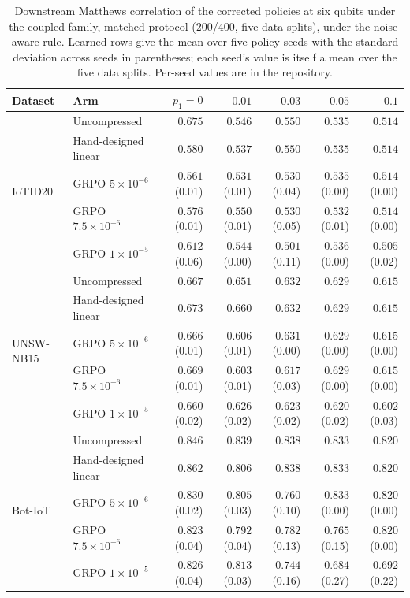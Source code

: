 \begin{table}[t]
\centering
\footnotesize
\setlength{\tabcolsep}{2.5pt}
\caption{Downstream Matthews correlation of the corrected policies at six qubits under
the coupled family, matched protocol (200/400, five data splits), under the noise-aware rule.
Learned rows give the mean over five policy seeds with the standard deviation across
seeds in parentheses; each seed's value is itself a mean over the five data splits.
Per-seed values are in the repository.}
\label{tab:compdownstream-nwe}
\begin{tabular}{@{}llrrrrr@{}}
\toprule
Dataset & Arm & $p_1 = 0$ & $0.01$ & $0.03$ & $0.05$ & $0.1$ \\
\midrule
\multirow{5}{*}{IoTID20}
 & Uncompressed & $0.675$ & $0.546$ & $0.550$ & $0.535$ & $0.514$ \\
 & Hand-designed linear & $0.580$ & $0.537$ & $0.550$ & $0.535$ & $0.514$ \\
 & GRPO $5\times10^{-6}$ & $0.561$ (0.01) & $0.531$ (0.01) & $0.530$ (0.04) & $0.535$ (0.00) & $0.514$ (0.00) \\
 & GRPO $7.5\times10^{-6}$ & $0.576$ (0.01) & $0.550$ (0.01) & $0.530$ (0.05) & $0.532$ (0.01) & $0.514$ (0.00) \\
 & GRPO $1\times10^{-5}$ & $0.612$ (0.06) & $0.544$ (0.00) & $0.501$ (0.11) & $0.536$ (0.00) & $0.505$ (0.02) \\
\midrule
\multirow{5}{*}{UNSW-NB15}
 & Uncompressed & $0.667$ & $0.651$ & $0.632$ & $0.629$ & $0.615$ \\
 & Hand-designed linear & $0.673$ & $0.660$ & $0.632$ & $0.629$ & $0.615$ \\
 & GRPO $5\times10^{-6}$ & $0.666$ (0.01) & $0.606$ (0.01) & $0.631$ (0.00) & $0.629$ (0.00) & $0.615$ (0.00) \\
 & GRPO $7.5\times10^{-6}$ & $0.669$ (0.01) & $0.603$ (0.01) & $0.617$ (0.03) & $0.629$ (0.00) & $0.615$ (0.00) \\
 & GRPO $1\times10^{-5}$ & $0.660$ (0.02) & $0.626$ (0.02) & $0.623$ (0.02) & $0.620$ (0.02) & $0.602$ (0.03) \\
\midrule
\multirow{5}{*}{Bot-IoT}
 & Uncompressed & $0.846$ & $0.839$ & $0.838$ & $0.833$ & $0.820$ \\
 & Hand-designed linear & $0.862$ & $0.806$ & $0.838$ & $0.833$ & $0.820$ \\
 & GRPO $5\times10^{-6}$ & $0.830$ (0.02) & $0.805$ (0.03) & $0.760$ (0.10) & $0.833$ (0.00) & $0.820$ (0.00) \\
 & GRPO $7.5\times10^{-6}$ & $0.823$ (0.04) & $0.792$ (0.04) & $0.782$ (0.13) & $0.765$ (0.15) & $0.820$ (0.00) \\
 & GRPO $1\times10^{-5}$ & $0.826$ (0.04) & $0.813$ (0.03) & $0.744$ (0.16) & $0.684$ (0.27) & $0.692$ (0.22) \\
\bottomrule
\end{tabular}
\end{table}
